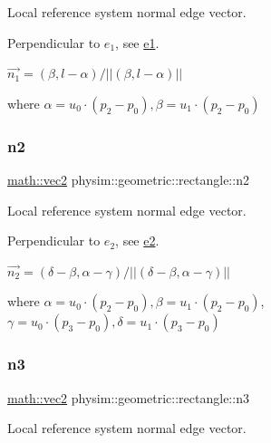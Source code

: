 Local reference system normal edge vector. 

Perpendicular to $e_1$, see \hyperlink{classphysim_1_1geometric_1_1rectangle_a511c131352fa83a64f3f30935ae87be7}{e1}.

$\vec{n_1} = (\beta, l - \alpha)/ || (\beta, l - \alpha) || $

where $\alpha = u_0\cdot(p_2-p_0), \beta = u_1\cdot(p_2-p_0)$ \mbox{\label{classphysim_1_1geometric_1_1rectangle_a0f79adf34a89ed7d8033aa1ad037ba2f}} 
\subsubsection{\texorpdfstring{n2}{n2}}
{\footnotesize\ttfamily \hyperlink{structphysim_1_1math_1_1vec2}{math\+::vec2} physim\+::geometric\+::rectangle\+::n2\hspace{0.3cm}{\ttfamily [private]}}



Local reference system normal edge vector. 

Perpendicular to $e_2$, see \hyperlink{classphysim_1_1geometric_1_1rectangle_a7d4880bb512b054f354393df0309c2b8}{e2}.

$\vec{n_2} = (\delta - \beta, \alpha - \gamma)/ || (\delta - \beta, \alpha - \gamma) || $

where $\alpha = u_0\cdot(p_2-p_0), \beta = u_1\cdot(p_2-p_0)$, $\gamma = u_0\cdot(p_3-p_0), \delta = u_1\cdot(p_3-p_0)$ \mbox{\label{classphysim_1_1geometric_1_1rectangle_a225b6af98f7ce91c6b0f4fc1aee25f72}} 
\subsubsection{\texorpdfstring{n3}{n3}}
{\footnotesize\ttfamily \hyperlink{structphysim_1_1math_1_1vec2}{math\+::vec2} physim\+::geometric\+::rectangle\+::n3\hspace{0.3cm}{\ttfamily [private]}}



Local reference system normal edge vector. 

